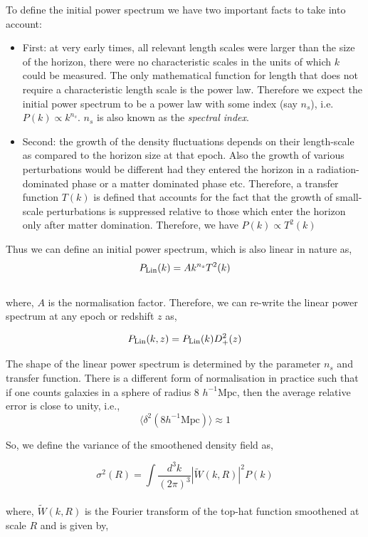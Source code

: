 To define the initial power spectrum we have two important facts to 
take into account:
\begin{itemize}
  \item	First: at very early times, all relevant length scales
	were larger than the size of the horizon, there were no characteristic scales
	in the units of which $k$ could be measured. The only mathematical function
	for length that does not require a characteristic length scale is
	the power law. Therefore we expect the initial power spectrum to be a power
	law with some index (say $n_s$), i.e. $P(k)\propto k^{n_s}$. $n_s$ is also known
	as the {\it spectral index}.
  \item Second: the growth of the density fluctuations depends on their length-scale
  	as compared to the horizon size at that epoch. Also the growth of various
  	perturbations would be different had they entered the horizon in a radiation-
  	dominated phase or a matter dominated phase etc. Therefore, a transfer function $T(k)$
  	is defined that accounts for the fact that the growth of small-scale perturbations
  	is suppressed relative to those which enter the horizon only after matter domination.
  	Therefore, we have $P(k) \propto T^2(k)$ 
\end{itemize}

Thus we can define an initial power spectrum, which is also linear in nature as,
\begin{equation}
	P_{\rm Lin}(k) = A k^{n_s} T^2(k)
\end{equation}
\\
where, $A$ is the normalisation factor. Therefore, we can re-write the linear
power spectrum at any epoch or redshift $z$ as,

\begin{equation}
	P_{\rm Lin}(k,z) = P_{\rm Lin}(k) D^2_+(z)
\end{equation}

The shape of the linear power spectrum is determined by the parameter $n_s$ and 
transfer function. There is a different form of normalisation in 
practice such that if one counts galaxies in a sphere of radius 8 $h^{-1} \mathrm{Mpc}$, then
the average relative error is close to unity, i.e.,
\begin{equation}
	\langle \delta^2(8 h^{-1} \mathrm{Mpc}) \rangle \approx 1 
\end{equation}

So, we define the variance of the smoothened density field as,

\begin{equation}
	\sigma^2(R) = \int \dfrac{d^3k}{(2\pi)^3} |\tilde{W}(k,R)|^2 P(k)
\end{equation}
\\
where, $\tilde{W}(k,R)$ is the Fourier transform of the top-hat function smoothened 
at scale $R$ and is given by,

